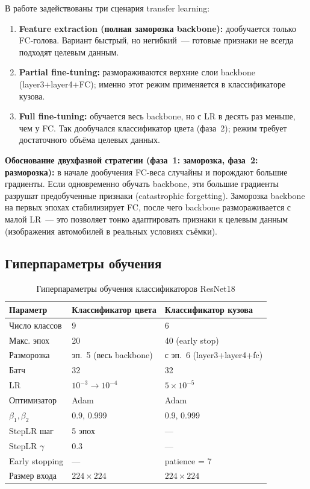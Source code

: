 \documentclass[10pt,a4paper]{report}
\numberwithin{equation}{chapter}
\numberwithin{figure}{chapter}
\numberwithin{table}{chapter}
\begin{document}
В работе задействованы три сценария transfer learning:
\begin{enumerate}
  \item \textbf{Feature extraction (полная заморозка backbone):}
    дообучается только FC-голова. Вариант быстрый, но негибкий~---
    готовые признаки не всегда подходят целевым данным.
  \item \textbf{Partial fine-tuning:} размораживаются верхние слои
    backbone (layer3+layer4+FC); именно этот режим применяется в
    классификаторе кузова.
  \item \textbf{Full fine-tuning:} обучается весь backbone, но с LR
    в десять раз меньше, чем у FC. Так дообучался классификатор цвета
    (фаза~2); режим требует достаточного объёма целевых данных.
\end{enumerate}

\textbf{Обоснование двухфазной стратегии (фаза~1: заморозка,
фаза~2: разморозка):} в начале дообучения FC-веса случайны
и порождают большие градиенты. Если одновременно обучать backbone,
эти большие градиенты разрушат предобученные признаки
(catastrophic forgetting). Заморозка backbone на первых эпохах
стабилизирует FC, после чего backbone размораживается с малой LR~---
это позволяет тонко адаптировать признаки к целевым данным
(изображения автомобилей в реальных условиях съёмки).

\subsection{Гиперпараметры обучения}

\begin{table}[H]
\centering
\caption{Гиперпараметры обучения классификаторов ResNet18}
\label{tab:resnet_hp}
\small
\begin{tabularx}{\textwidth}{lXX}
\toprule
\textbf{Параметр} & \textbf{Классификатор цвета} & \textbf{Классификатор кузова} \\
\midrule
Число классов     & 9              & 6 \\
Макс. эпох        & 20             & 40 (early stop) \\
Разморозка        & эп.~5 (весь backbone) & с эп.~6 (layer3+layer4+fc) \\
Батч              & 32             & 32 \\
LR                & $10^{-3} \to 10^{-4}$ & $5 \times 10^{-5}$ \\
Оптимизатор       & Adam           & Adam \\
$\beta_1, \beta_2$ & 0.9, 0.999   & 0.9, 0.999 \\
StepLR шаг        & 5 эпох         & ---  \\
StepLR $\gamma$   & 0.3            & ---  \\
Early stopping    & ---            & patience = 7 \\
Размер входа      & $224\times224$ & $224\times224$ \\
\bottomrule
\end{tabularx}
\end{table}
\end{document}

